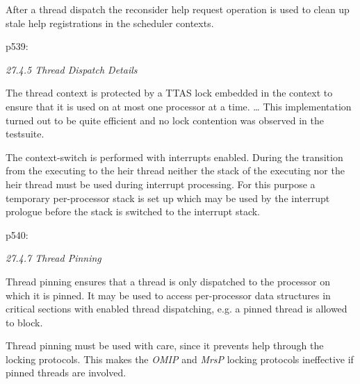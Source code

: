 After a thread dispatch
the reconsider help request operation is used
to clean up stale help registrations in the scheduler contexts.

p539:

\emph{27.4.5 Thread Dispatch Details}

The thread context is protected by a TTAS lock
embedded in the context to ensure that
it is used on at most one processor at a time.
\dots
This implementation turned out to be quite efficient
and no lock contention was observed in the testsuite.

The context-switch is performed with interrupts enabled.
During the transition from the executing to the heir thread
neither the stack of the executing nor the heir thread must be used
during interrupt processing.
For this purpose a temporary per-processor stack is set up
which may be used by the interrupt prologue
before the stack is switched to the interrupt stack.

p540:

\emph{27.4.7 Thread Pinning}

Thread pinning ensures that a thread is only dispatched to the processor
on which it is pinned.
It may be used to access per-processor data structures
in critical sections with enabled thread dispatching,
e.g. a pinned thread is allowed to block.

Thread pinning must be used with care,
since it prevents help through the locking protocols.
This makes the \textit{OMIP} and \textit{MrsP} locking protocols ineffective 
if pinned threads are involved.
